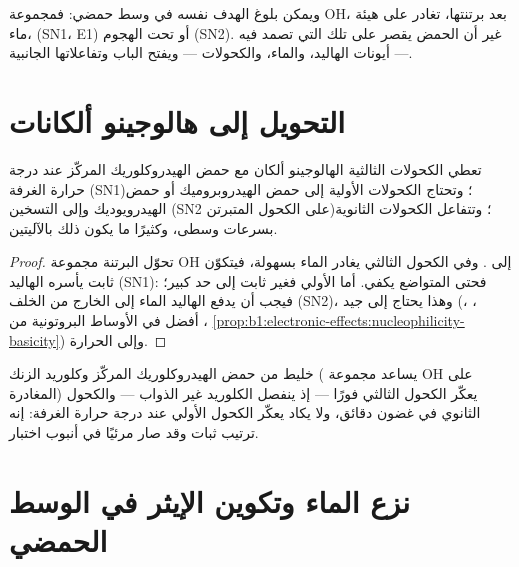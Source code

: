 ويمكن بلوغ الهدف نفسه في وسط حمضي: فمجموعة OH، بعد برتنتها، تغادر على هيئة
ماء،  (SN1، E1) أو تحت الهجوم (SN2). غير أن الحمض يقصر
 على تلك التي تصمد فيه --- أيونات الهاليد، والماء،
والكحولات --- ويفتح الباب  وتفاعلاتها الجانبية.

\section{التحويل إلى هالوجينو ألكانات}

\begin{proposition}\label{prop:b1:alcohol-activation:hx-by-class}
تعطي الكحولات الثالثية الهالوجينو ألكان مع حمض الهيدروكلوريك المركّز
عند درجة حرارة الغرفة (SN1)؛ وتحتاج الكحولات الأولية إلى حمض الهيدروبروميك أو
حمض الهيدرويوديك وإلى التسخين (SN2 على الكحول المتبرتن)؛ وتتفاعل الكحولات
الثانوية بسرعات وسطى، وكثيرًا ما يكون ذلك بالآليتين.
\end{proposition}

\begin{proof}
تحوّل البرتنة مجموعة OH إلى . وفي الكحول الثالثي يغادر الماء
بسهولة، فيتكوّن  ثابت يأسره الهاليد (SN1): فحتى
 المتواضع  يكفي. أما  الأولي فغير ثابت
إلى حد كبير؛ فيجب أن يدفع الهاليد الماء إلى الخارج من الخلف (SN2)، وهذا يحتاج إلى
 جيد (، ، أفضل في الأوساط البروتونية من ،
\cref{prop:b1:electronic-effects:nucleophilicity-basicity}) وإلى الحرارة.
\end{proof}

\begin{example}\label{ex:b1:alcohol-activation:lucas}
خليط من حمض الهيدروكلوريك المركّز وكلوريد الزنك (
يساعد مجموعة OH على المغادرة) يعكّر الكحول الثالثي فورًا ---
إذ ينفصل الكلوريد غير الذواب --- والكحول الثانوي في غضون دقائق،
ولا يكاد يعكّر الكحول الأولي عند درجة حرارة الغرفة: إنه ترتيب
ثبات  وقد صار مرئيًا في أنبوب اختبار.
\end{example}

\section{نزع الماء وتكوين الإيثر في الوسط الحمضي}

